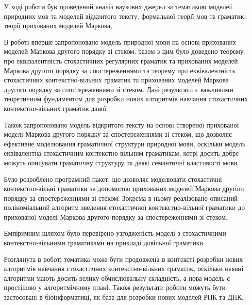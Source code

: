 У ході роботи був проведений аналіз наукових джерел за тематикою моделей природних мов та моделей відкритого тексту, формальної теорії мов та граматик, теорії прихованих моделей Маркова,

В роботі вперше запропоновано модель природної мови на основі прихованих моделей Маркова другого порядку зі стеком, разом з цим було доведено теорему про еквівалентність стохастичних регулярних граматик та прихованих моделей Маркова
другого порядку за спостереженнями та теорему про еквівалентність стохастичних контекстно-вільних граматик
та прихованих моделей Маркова другого порядку за спостереженнями зі стеком.
Дані результати є важливими теоретичним фундаментом для розробки нових алгоритмів навчання стохастичних
контекстно-вільних граматик.даної

Також запропоновано модель відкритого тексту на основі створеної прихованої моделі Маркова другого порядку за спостереженнями зі стеком, що дозволяє ефективне моделювання граматичної структури природної мови, оскільки модель еквівалентна стохастичним контекстно-вільним граматикам, котрі досить добре можуть описувати граматичну структуру та деякі семантичні властивості мови.

Було розроблено програмний пакет, що дозволяє моделювати стохастичні
контекстно-вільні граматики за допомогою прихованих моделей Маркова другого порядку за спостереженнями зі стеком.
Зокрема в ньому реалізовано описаний поліноміальний алгоритм зведення стохастичної контекстно-вільної граматики
до прихованої моделі Маркова другого порядку за спостереженнями зі стеком.

Емпіричним шляхом було перевірено узгодженість моделі з стохастичними контекстно-вільними граматиками на прикладі довільної граматики.

Розглянута в роботі тематика може бути продовжена в контексті розробки нових алгоритмів навчання стохастичних контекстно-вільних
граматик, оскільки наявні алгоритми мають досить велику обчислювальну складність, а нова модель є простішою у алгоритмічному плані. Також результати роботи можуть бути застосовані в біоінформатиці, як база для розробки нових моделей РНК та ДНК.
